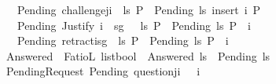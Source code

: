 \begin{isabellebody}
\ \ {\isacharbar}{\kern0pt}\ {\isachardoublequoteopen}Pending\ {\isacharparenleft}{\kern0pt}challenge{\isacharbrackleft}{\kern0pt}j{\isacharcomma}{\kern0pt}i{\isacharcomma}{\kern0pt}{\isasymphi}{\isacharbrackright}{\kern0pt}\ {\isacharhash}{\kern0pt}\ ls{\isacharparenright}{\kern0pt}\ P\ {\isacharequal}{\kern0pt}\ Pending\ ls\ {\isacharparenleft}{\kern0pt}insert\ {\isacharparenleft}{\kern0pt}i{\isacharcomma}{\kern0pt}{\isasymphi}{\isacharparenright}{\kern0pt}\ P{\isacharparenright}{\kern0pt}{\isachardoublequoteclose}\isanewline
\ \ {\isacharbar}{\kern0pt}\ {\isachardoublequoteopen}Pending\ {\isacharparenleft}{\kern0pt}Justify\ i\ {\isasymPhi}\ sg\ {\isasymphi}\ {\isacharhash}{\kern0pt}\ ls{\isacharparenright}{\kern0pt}\ P\ {\isacharequal}{\kern0pt}\ Pending\ ls\ {\isacharparenleft}{\kern0pt}P\ {\isacharminus}{\kern0pt}\ {\isacharbraceleft}{\kern0pt}{\isacharparenleft}{\kern0pt}i{\isacharcomma}{\kern0pt}{\isasymphi}{\isacharparenright}{\kern0pt}{\isacharbraceright}{\kern0pt}{\isacharparenright}{\kern0pt}{\isachardoublequoteclose}\isanewline
\ \ {\isacharbar}{\kern0pt}\ {\isachardoublequoteopen}Pending\ {\isacharparenleft}{\kern0pt}retract{\isacharbrackleft}{\kern0pt}i{\isacharcomma}{\kern0pt}{\isasymphi}{\isacharcomma}{\kern0pt}sg{\isacharbrackright}{\kern0pt}\ {\isacharhash}{\kern0pt}\ ls{\isacharparenright}{\kern0pt}\ P\ {\isacharequal}{\kern0pt}\ Pending\ ls\ {\isacharparenleft}{\kern0pt}P\ {\isacharminus}{\kern0pt}\ {\isacharbraceleft}{\kern0pt}{\isacharparenleft}{\kern0pt}i{\isacharcomma}{\kern0pt}{\isasymphi}{\isacharparenright}{\kern0pt}{\isacharbraceright}{\kern0pt}{\isacharparenright}{\kern0pt}{\isachardoublequoteclose}\isanewline
\isanewline
{}\isamarkupfalse%
\ Answered\ {\isacharcolon}{\kern0pt}{\isacharcolon}{\kern0pt}\ {\isachardoublequoteopen}FatioL\ list{\isasymRightarrow}bool{\isachardoublequoteclose}\ \ {\isachardoublequoteopen}Answered\ ls\ {\isasymequiv}\ Pending\ ls\ {\isacharbraceleft}{\kern0pt}{\isacharbraceright}{\kern0pt}\ {\isacharequal}{\kern0pt}\ {\isacharbraceleft}{\kern0pt}{\isacharbraceright}{\kern0pt}{\isachardoublequoteclose}\isanewline
\isanewline
{}\isamarkupfalse%
\ PendingRequest{\isacharcolon}{\kern0pt}\ {\isachardoublequoteopen}Pending\ {\isacharbrackleft}{\kern0pt}question{\isacharbrackleft}{\kern0pt}j{\isacharcomma}{\kern0pt}i{\isacharcomma}{\kern0pt}{\isasymphi}{\isacharbrackright}{\kern0pt}{\isacharbrackright}{\kern0pt}\ {\isacharbraceleft}{\kern0pt}{\isacharbraceright}{\kern0pt}\ {\isacharequal}{\kern0pt}\ {\isacharbraceleft}{\kern0pt}{\isacharparenleft}{\kern0pt}i{\isacharcomma}{\kern0pt}{\isasymphi}{\isacharparenright}{\kern0pt}{\isacharbraceright}{\kern0pt}{\isachardoublequoteclose}%

\end{isabellebody}
